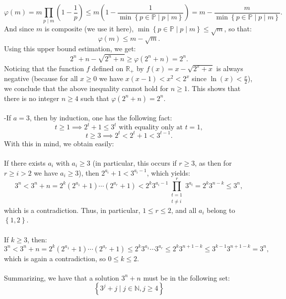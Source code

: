 \begin{solution}
    \[
        \varphi\left(m\right) = m \prod_{p \mid m} \left(1 - \frac{1}{p}\right) \leq m \left(1 - \frac{1}{\min \left\{ p \in \mathbb{P} \mid p \mid m \right\}}\right) = m - \frac{m}{\min \left\{ p \in \mathbb{P} \mid p \mid m \right\}}.
    \]
    And since \( m \) is composite (we use it here), \( \min \left\{ p \in \mathbb{P} \mid p \mid m \right\} \leq \sqrt{m} \), so that:
    \[
        \varphi\left(m\right) \leq m - \sqrt{m}.
    \]
    Using this upper bound estimation, we get:
    \[
        2^n + n - \sqrt{2^n + n} \geq \varphi \left(2^n + n\right) = 2^n.
    \]
    Noticing that the function \( f \) defined on \( \mathbb{R}_+ \) by \( f\left(x\right) = x - \sqrt{2^x + x} \) is always negative (because for all \( x\geq 0 \) we have \( x\left(x-1\right)<x^2<2^x \) since \( \ln\left(x\right)<\frac{x}{2} \)), we conclude that the above inequality cannot hold for \( n \geq 1 \). This shows that there is no integer \( n \geq 4 \) such that \( \varphi\left(2^n + n\right) = 2^n \).
    \\\\
    -If \( a = 3 \), then by induction, one has the following fact:
    \[
        t \geq 1 \implies 2^t + 1 \leq 3^t \text{ with equality only at } t = 1,
    \]
    \[
        t \geq 3 \implies 2^t < 2^t + 1 < 3^{t-1}.
    \]
    With this in mind, we obtain easily:
    \\\\
    If there exists \( a_i \) with \( a_i \geq 3 \) (in particular, this occurs if \( r \geq 3 \), as then for \( r \geq i > 2 \) we have \( a_i \geq 3 \)), then \( 2^{a_i} + 1 < 3^{a_i - 1} \), which yields:
    \[
        3^n < 3^n + n = 2^k \left(2^{a_1} + 1\right) \cdots \left(2^{a_r} + 1\right) < 2^k 3^{a_i - 1} \prod_{\substack{t=1 \\ t \neq i}}^r 3^{a_t} = 2^k 3^{n - k} \leq 3^n,
    \]
    which is a contradiction. Thus, in particular, \( 1 \leq r \leq 2 \), and all \( a_i \) belong to \( \left\{1,2\right\} \).
    \\\\
    If \( k \geq 3 \), then:
    \[
        3^n < 3^n + n = 2^k \left(2^{a_1} + 1\right) \cdots \left(2^{a_r} + 1\right) \leq 2^k 3^{a_1} \cdots 3^{a_r} \leq 2^k 3^{n + 1 - k} \leq 3^{k - 1} 3^{n + 1 - k} = 3^n,
    \]
    which is again a contradiction, so \( 0 \leq k \leq 2 \).
    \\\\
    Summarizing, we have that a solution \( 3^n+n \) must be in the following set:
    \[
        \left\{3^j + j \mid j \in \mathbb{N}, j \geq 4\right\}
\]
\end{solution}
